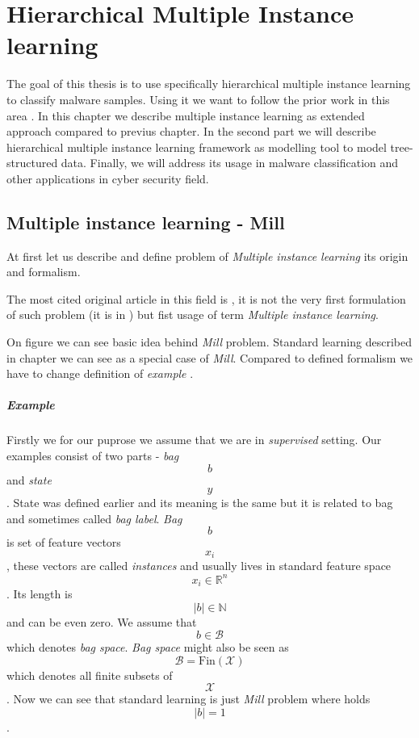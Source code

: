 \chapter{Hierarchical Multiple Instance learning}
The goal of this thesis is to use specifically hierarchical multiple instance learning to classify malware samples. Using it we want to follow the prior work in this area \cite{Mandlik2020}.
In this chapter we describe multiple instance learning as extended approach compared to previus chapter. In the second part we will describe hierarchical multiple instance learning framework as modelling tool to model tree-structured data. Finally, we will address its usage in malware classification and other applications in cyber security field.

\section{Multiple instance learning - Mill}
At first let us describe and define problem of \emph{Multiple instance learning} its origin and formalism.

The most cited original article in this field is \citet{Dietterich1997}, it is not the very first formulation of such problem (it is in \cite{Keeler1991}) but fist usage of term \emph{Multiple instance learning}.

On figure  we can see basic idea behind \emph{Mill} problem. Standard learning described in chapter  we can see as a special case of \emph{Mill}. Compared to defined formalism we have to change definition of \emph{example} . 
\paragraph{Example}
Firstly we for our puprose we assume that we are in \emph{supervised} setting. Our examples consist of two parts - \emph{bag} $$b$$ and \emph{state} $$y$$. State was defined earlier and its meaning is the same but it is related to bag and sometimes called \emph{bag label}. \emph{Bag} $$b$$ is set of feature vectors $$x_i$$, these vectors are called \emph{instances} and usually lives in standard feature space $$x_i \in \mathbb{R}^{n}$$. Its length is $$|b| \in \mathbb{N}$$ and can be even zero. We assume that $$b \in \mathcal{B}$$ which denotes \emph{bag space}. \emph{Bag space} might also be seen as $$\mathcal{B} = \mathrm{Fin}(\mathcal{X})$$ which denotes all finite subsets of $$\mathcal{X}$$. Now we can see that standard learning is just \emph{Mill} problem where holds $$|b| = 1$$.

